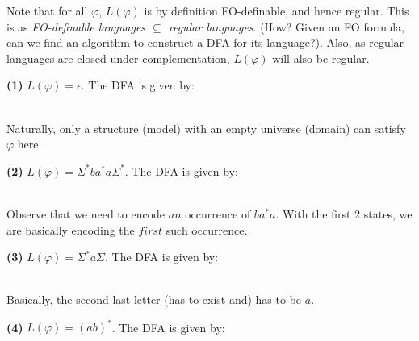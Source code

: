 \documentclass{article}
\begin{document}
\begin{flushleft}
Note that for all $\varphi$, $L(\varphi)$ is by definition FO-definable, and hence regular. This is as \textit{FO-definable languages $\subseteq$ regular languages}. (How? Given an FO formula, can we find an algorithm to construct a DFA for its language?). Also, as regular languages are closed under complementation, $\overline{L(\varphi)}$ will also be regular. 

\textbf{(1)} $L(\varphi) = {\epsilon}.$ The DFA is given by:\vspace{3mm}

 \\
Naturally, only a structure (model) with an empty universe (domain) can satisfy $\varphi$ here.

\textbf{(2)} $L(\varphi) = \Sigma^* b a^* a \Sigma^*$. The DFA is given by:\vspace{3mm}

\\
Observe that we need to encode $an$ occurrence of $b a^* a$. With the first 2 states, we are basically encoding the $first$ such occurrence.

\textbf{(3)} $L(\varphi) = \Sigma^* a \Sigma$. The DFA is given by:\vspace{3mm}

\\
Basically, the second-last letter (has to exist and) has to be $a$.

\textbf{(4)} $L(\varphi) = (ab)^*$. The DFA is given by:\vspace{3mm}


\end{flushleft}
\end{document}
